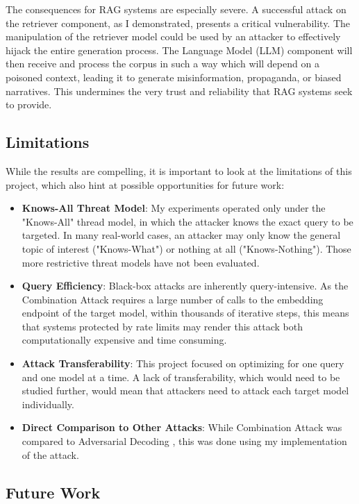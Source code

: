 \documentclass[a4paper, sigconf]{acmart}
\begin{document}
The consequences for RAG systems are especially severe. A successful attack on the retriever component, as I demonstrated, presents a critical vulnerability. The manipulation of the retriever model could be used by an attacker to effectively hijack the entire generation process. The Language Model (LLM) component will then receive and process the corpus in such a way which will depend on a poisoned context, leading it to generate misinformation, propaganda, or biased narratives. This undermines the very trust and reliability that RAG systems seek to provide. 


\subsection{Limitations}

While the results are compelling, it is important to look at the limitations of this project, which also hint at possible opportunities for future work:

\begin{itemize}
  \item \textbf{Knows-All Threat Model}: My experiments operated only under the "Knows-All" thread model, in which the attacker knows the exact query to be targeted. In many real-world cases, an attacker may only know the general topic of interest ("Knows-What") or nothing at all ("Knows-Nothing"). Those more restrictive threat models have not been evaluated.
  \item \textbf{Query Efficiency}: Black-box attacks are inherently query-intensive. As the Combination Attack requires a large number of calls to the embedding endpoint of the target model, within thousands of iterative steps, this means that systems protected by rate limits may render this attack both computationally expensive and time consuming. 
  \item \textbf{Attack Transferability}: This project focused on optimizing for one query and one model at a time. A lack of transferability, which would need to be studied further, would mean that attackers need to attack each target model individually. 
  \item \textbf{Direct Comparison to Other Attacks}: While Combination Attack was compared to Adversarial Decoding \cite{advdec}, this was done using my implementation of the attack. 
\end{itemize}


\subsection{Future Work}
\end{document}
